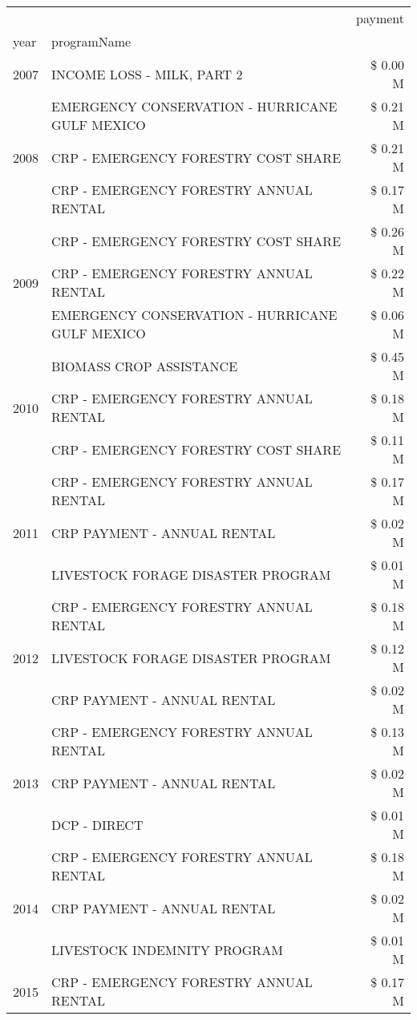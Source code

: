 \begin{tabular}{llr}
\toprule
 &  & payment \\
year & programName &  \\
\midrule
2007 & INCOME LOSS - MILK, PART 2 & \$ 0.00 M \\
\cline{1-3}
\multirow[t]{3}{*}{2008} & EMERGENCY CONSERVATION - HURRICANE GULF MEXICO & \$ 0.21 M \\
 & CRP - EMERGENCY FORESTRY COST SHARE & \$ 0.21 M \\
 & CRP - EMERGENCY FORESTRY ANNUAL RENTAL & \$ 0.17 M \\
\cline{1-3}
\multirow[t]{3}{*}{2009} & CRP - EMERGENCY FORESTRY COST SHARE & \$ 0.26 M \\
 & CRP - EMERGENCY FORESTRY ANNUAL RENTAL & \$ 0.22 M \\
 & EMERGENCY CONSERVATION - HURRICANE GULF MEXICO & \$ 0.06 M \\
\cline{1-3}
\multirow[t]{3}{*}{2010} & BIOMASS CROP ASSISTANCE & \$ 0.45 M \\
 & CRP - EMERGENCY FORESTRY ANNUAL RENTAL & \$ 0.18 M \\
 & CRP - EMERGENCY FORESTRY COST SHARE & \$ 0.11 M \\
\cline{1-3}
\multirow[t]{3}{*}{2011} & CRP - EMERGENCY FORESTRY ANNUAL RENTAL & \$ 0.17 M \\
 & CRP PAYMENT - ANNUAL RENTAL & \$ 0.02 M \\
 & LIVESTOCK FORAGE DISASTER PROGRAM & \$ 0.01 M \\
\cline{1-3}
\multirow[t]{3}{*}{2012} & CRP - EMERGENCY FORESTRY ANNUAL RENTAL & \$ 0.18 M \\
 & LIVESTOCK FORAGE DISASTER PROGRAM & \$ 0.12 M \\
 & CRP PAYMENT - ANNUAL RENTAL & \$ 0.02 M \\
\cline{1-3}
\multirow[t]{3}{*}{2013} & CRP - EMERGENCY FORESTRY ANNUAL RENTAL & \$ 0.13 M \\
 & CRP PAYMENT - ANNUAL RENTAL & \$ 0.02 M \\
 & DCP - DIRECT & \$ 0.01 M \\
\cline{1-3}
\multirow[t]{3}{*}{2014} & CRP - EMERGENCY FORESTRY ANNUAL RENTAL & \$ 0.18 M \\
 & CRP PAYMENT - ANNUAL RENTAL & \$ 0.02 M \\
 & LIVESTOCK INDEMNITY PROGRAM & \$ 0.01 M \\
\cline{1-3}
\multirow[t]{3}{*}{2015} & CRP - EMERGENCY FORESTRY ANNUAL RENTAL & \$ 0.17 M \\

\end{tabular}
